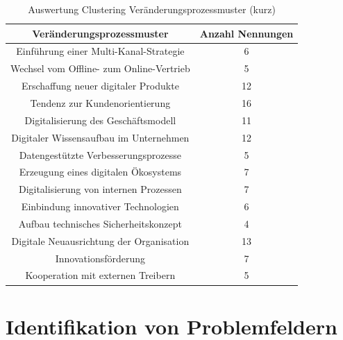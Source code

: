 
\begin{table}[ht]
	\centering
	\caption{Auswertung Clustering Veränderungsprozessmuster (kurz)}
	\begin{tabular}{|c|c|}
		\hline
		\textbf{Veränderungsprozessmuster}& \textbf{Anzahl Nennungen} \\
		\hline
		Einführung einer Multi-Kanal-Strategie   & 6  \\
		Wechsel vom Offline- zum Online-Vertrieb & 5  \\
		Erschaffung neuer digitaler Produkte     & 12 \\
		Tendenz zur Kundenorientierung           & 16 \\
		Digitalisierung des Geschäftsmodell      & 11 \\
		Digitaler Wissensaufbau im Unternehmen   & 12 \\
		Datengestützte Verbesserungsprozesse     & 5  \\
		Erzeugung eines digitalen Ökosystems     & 7  \\
		Digitalisierung von internen Prozessen   & 7  \\
		Einbindung innovativer Technologien      & 6  \\
		Aufbau technisches Sicherheitskonzept    & 4  \\
		Digitale Neuausrichtung der Organisation & 13 \\
		Innovationsförderung                     & 7  \\
		Kooperation mit externen Treibern        & 5 \\
		\hline
	\end{tabular}
	\label{tab:clusteringvpshort}
\end{table}

\todots

\section{Identifikation von Problemfeldern}


